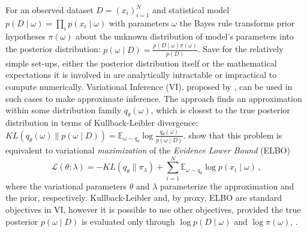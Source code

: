 \documentclass{article}
\begin{document}
For an observed dataset $
  D = (x_i)_{i=1}^N
$ and statistical model $
  p(D \mid \omega)
    = \prod_i p(x_i \mid \omega)
$ with parameters $\omega$ the Bayes rule transforms prior hypotheses $\pi(\omega)$
about the unknown distribution of model's parameters into the posterior distribution: $
  p(\omega \mid D) = \tfrac{p(D \mid \omega) \pi(\omega)}{p(D)}
$.
%
Save for the relatively simple set-ups, either the posterior distribution itself or the
mathematical expectations it is involved in are analytically intractable or impractical
to compute numerically. Variational Inference (VI), proposed by \citet{jordan_introduction_1999},
can be used in such cases to make approximate inference. The approach finds an approximation
within some distribution family $q_\theta(\omega)$, which is closest to the true posterior
distribution in terms of Kullback-Leibler divergence: $
  KL(q_\theta(\omega) \| p(\omega \mid D))
    = \mathbb{E}_{\omega \sim q_\theta}
      \log \tfrac{q_\theta(\omega)}{p(\omega \mid D)}
$. %
%
\citet{jordan_introduction_1999} show that this problem is equivalent to variational
\emph{maximization} of the \emph{Evidence Lower Bound} (ELBO)
\begin{equation}  \label{eq:elbo_general}
  \mathcal{L}(\theta; \lambda)
    = - KL(q_{\theta} \| \pi_{\lambda})
      + \sum_{i=1}^N \mathbb{E}_{\omega \sim q_{\theta}}
        \log p(x_i \mid \omega)
  \,,
\end{equation}
where the variational parameters $\theta$ and $\lambda$ parameterize the approximation
and the prior, respectively.
%
Kullback-Leibler and, by proxy, ELBO are standard objectives in VI, however it is possible
to use other objectives, provided the true posterior $p(\omega \mid D)$ is evaluated only
through $\log p(D \mid \omega)$ and $\log \pi(\omega)$, \citep{ranganath_operator_2016}.
\end{document}
